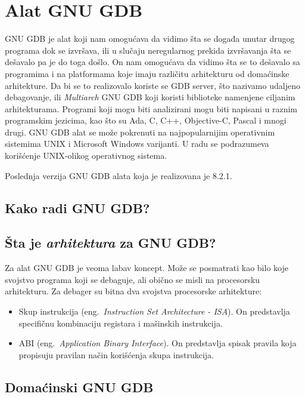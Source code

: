 \documentclass[12pt,oneside]{memoir}
\begin{document}
\chapter{Alat GNU GDB}
\label{chp:GDB}

GNU GDB je alat koji nam omogućava da vidimo šta se događa unutar drugog programa dok se izvršava, ili u slučaju neregularnog prekida izvršavanja šta se dešavalo pa je do toga došlo. On nam omogućava da vidimo šta se to dešavalo sa programima i na platformama koje imaju različitu arhitekturu od domaćinske arhitekture. Da bi se to realizovalo koriste se GDB server, što nazivamo udaljeno debagovanje, ili \emph{Multiarch} GNU GDB koji koristi biblioteke namenjene ciljanim arhitekturama. Programi koji mogu biti analizirani mogu biti napisani u raznim programskim jezicima, kao što su Ada, C, C++, Objective-C, Pascal i mnogi drugi. GNU GDB alat se može pokrenuti na najpopularnijim operativnim sistemima UNIX i Microsoft Windows varijanti. U radu se podrazumeva korišćenje UNIX-olikog operativnog sistema.

Poslednja verzija GNU GDB alata koja je realizovana je 8.2.1.

\section{Kako radi GNU GDB?}


\section{Šta je \emph{arhitektura} za GNU GDB?}

Za alat GNU GDB je veoma labav koncept. Može se posmatrati kao bilo koje svojstvo programa koji se debaguje, ali obično se misli na procesorsku arhitekturu. Za debager su bitna dva svojstva procesorske arhitekture:

\begin{itemize}
	\item Skup instrukcija (eng.~\emph{Instruction Set Architecture - ISA}). On predstavlja specifičnu kombinaciju registara i mašinskih instrukcija.
	\item ABI (eng.~\emph{Application Binary Interface}). On predstavlja spisak pravila koja propisuju pravilan način korišćenja skupa instrukcija.
\end{itemize}

\section{Domaćinski GNU GDB}
\end{document}
